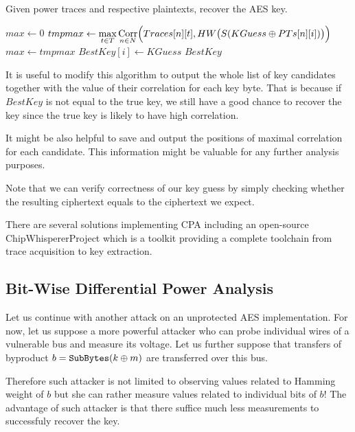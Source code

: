 \begin{alg}
\label{alg:cpa}
Given power traces and respective plaintexts, recover the AES key.
	\begin{algorithmic}[1]
				\State $max \gets 0$
					\State $tmpmax \gets \max\limits_{t\in T} \operatorname*{Corr}\limits_{n\in N}\Bigl(Traces[n][t], HW\bigl(S(KGuess\oplus PTs[n][i])\bigr)\Bigr)$
						\State $max \gets tmpmax$
						\State $BestKey[i] \gets KGuess$
					\EndIf
				\EndFor
			\EndFor
			\State\Return $BestKey$
		\EndFunction
	\end{algorithmic}
\end{alg}

\begin{note}
\label{note:leakpos}
	It is useful to modify this algorithm to output the whole list of key candidates together with the value of their correlation for each key byte. That is because if $BestKey$ is not equal to the true key, we still have a good chance to recover the key since the true key is likely to have high correlation.
	
	It might be also helpful to save and output the positions of maximal correlation for each candidate. This information might be valuable for any further analysis purposes.
	
	Note that we can verify correctness of our key guess by simply checking whether the resulting ciphertext equals to the ciphertext we expect.
\end{note}

There are several solutions implementing CPA including an open-source ChipWhisperer\texttrademark Project \cite{chipwhisperer} which is a toolkit providing a complete toolchain from trace acquisition to key extraction.

\subsection{Bit-Wise Differential Power Analysis}

Let us continue with another attack on an unprotected AES implementation. For now, let us suppose a more powerful attacker who can probe individual wires of a vulnerable bus and measure its voltage. Let us further suppose that transfers of byproduct $b = \texttt{SubBytes}(k\oplus m)$ are transferred over this bus.

Therefore such attacker is not limited to observing values related to Hamming weight of $b$ but she can rather measure values related to individual bits of $b$! The advantage of such attacker is that there suffice much less measurements to successfuly recover the key.

